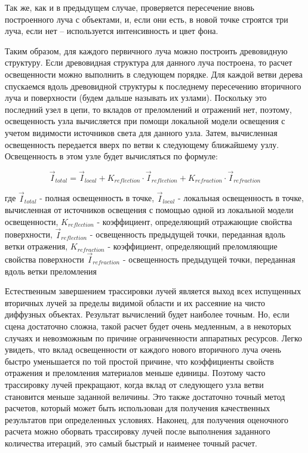 \documentclass[12pt, a4paper]{article}
\begin{document}
Так же, как и в предыдущем случае, проверяется пересечение вновь построенного луча с объектами, и, если они есть, в новой точке строятся три луча, если нет -- используется интенсивность и цвет фона.

Таким образом, для каждого первичного луча можно построить древовидную структуру. Если древовидная структура для данного луча построена, то расчет освещенности можно выполнить в следующем порядке. Для каждой ветви дерева спускаемся вдоль древовидной структуры к последнему пересечению вторичного луча и поверхности (будем дальше называть их узлами). Поскольку это последний узел в цепи, то  вкладов от преломлений и отражений нет, поэтому, освещенность узла вычисляется при помощи локальной модели освещения с учетом видимости источников света для данного узла. Затем, вычисленная освещенность передается вверх по ветви к следующему ближайшему узлу. Освещенность в этом узле будет вычисляться по формуле:

$$
 \vec{I}_{total} = \vec{I}_{local} + K_{reflection} \cdot \vec{I}_{reflection} + K_{refraction} \cdot \vec{I}_{refraction}
$$

где $\vec{I}_{total}$ - полная освещенность в точке, $\vec{I}_{local}$ - локальная освещенность в точке, вычисленная от источников освещения с помощью одной из локальной модели освещенности, $K_{reflection}$ - коэффициент, определяющий отражающие свойства поверхности, $\vec{I}_{reflection}$ - освещенность предыдущей точки, переданная вдоль ветки отражения,   $K_{refraction}$ - коэффициент, определяющий преломляющие свойства поверхности $\vec{I}_{refraction}$ - освещенность предыдущей точки, переданная вдоль ветки преломления

Естественным завершением трассировки лучей является выход всех испущенных вторичных лучей за пределы видимой области и их рассеяние на чисто диффузных объектах. Результат вычислений будет наиболее точным. Но, если сцена достаточно сложна, такой расчет будет очень медленным, а в некоторых случаях и невозможным по причине ограниченности аппаратных ресурсов. Легко увидеть, что вклад освещенности от каждого нового вторичного луча очень быстро уменьшается по той простой причине, что коэффициенты свойств отражения и преломления материалов меньше единицы. Поэтому часто трассировку лучей прекращают, когда вклад от следующего узла ветви становится меньше заданной величины. Это также достаточно точный метод расчетов, который может быть использован для получения качественных результатов при определенных условиях. Наконец, для получения оценочного расчета можно оборвать трассировку лучей после выполнения заданного количества итераций, это самый быстрый и наименее точный расчет.
\end{document}
